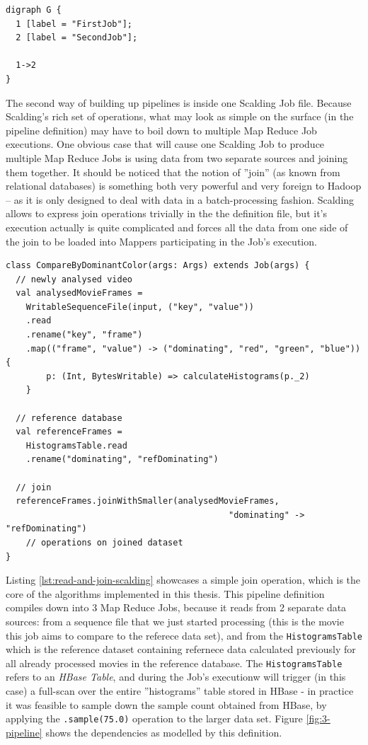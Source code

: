 \begin{lstlisting}[caption={Textual description of graph on Figure \ref{fig:simplect-pipeline}, using the DOT graph description language.}, label={lst:simplest-pipeline-dot}]
digraph G {
  1 [label = "FirstJob"];
  2 [label = "SecondJob"];
  
  1->2
}
\end{lstlisting}

The second way of building up pipelines is inside one Scalding Job file. Because Scalding's rich set of operations, what may look as simple on the surface (in the pipeline definition) may have to boil down to multiple Map Reduce Job executions. One obvious case that will cause one Scalding Job to produce multiple Map Reduce Jobs is using data from two separate sources and joining them together. It should be noticed that the notion of ''join'' (as known from relational databases) is something both very powerful and very foreign to Hadoop -- as it is only designed to deal with data in a batch-processing fashion. Scalding allows to express join operations trivially in the the definition file, but it's execution actually is quite complicated and forces all the data from one side of the join to be loaded into Mappers participating in the Job's execution.

\begin{lstlisting}[caption={Scalding job, reading data from 2 sources and joining them on dominantColor, producing 3 Map Reduce Jobs}, label={lst:read-and-join-scalding}]
class CompareByDominantColor(args: Args) extends Job(args) {
  // newly analysed video
  val analysedMovieFrames = 
    WritableSequenceFile(input, ("key", "value"))
    .read
    .rename("key", "frame")
    .map(("frame", "value") -> ("dominating", "red", "green", "blue")) { 
        p: (Int, BytesWritable) => calculateHistograms(p._2)
    }
  
  // reference database
  val referenceFrames = 
    HistogramsTable.read
    .rename("dominating", "refDominating")

  // join
  referenceFrames.joinWithSmaller(analysedMovieFrames, 
                                            "dominating" -> "refDominating")
    // operations on joined dataset
}
\end{lstlisting}

Listing \ref{lst:read-and-join-scalding} showcases a simple join operation, which is the core of the algorithms implemented in this thesis. This pipeline definition compiles down into 3 Map Reduce Jobs, because it reads from 2 separate data sources: from a sequence file that we just started processing (this is the movie this job aims to compare to the referece data set), and from the \verb|HistogramsTable| which is the reference dataset containing refernece data calculated previously for all already processed movies in the reference database. The \verb|HistogramsTable| refers to an \textit{HBase Table}, and during the Job's executionw will trigger (in this case) a full-scan over the entire ''histograms'' table stored in HBase - in practice it was feasible to sample down the sample count obtained from HBase, by applying the \verb|.sample(75.0)| operation to the larger data set. Figure \ref{fig:3-pipeline} shows the dependencies as modelled by this definition.

